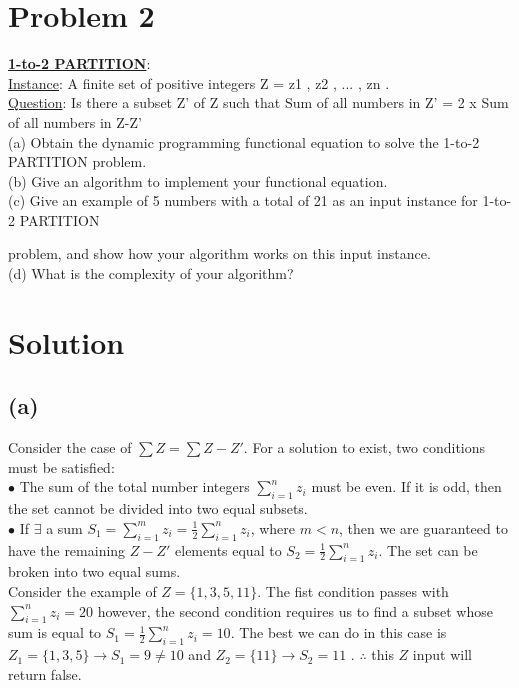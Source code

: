 
\section*{Problem 2}
    \textbf{\underline{1-to-2 PARTITION}}:\\
    \underline{Instance}: A finite set of positive integers Z = { z1 , z2 , ... , zn }.\\
    \underline{Question}: Is there a subset Z' of Z such that
    Sum of all numbers in Z' = 2 x Sum of all numbers in Z-Z'\\
    
    \noindent
    (a) Obtain the dynamic programming functional equation to solve the 1-to-2 PARTITION problem.\\
    (b) Give an algorithm to implement your functional equation.\\
    (c) Give an example of 5 numbers with a total of 21 as an input instance for 1-to-2 PARTITION
    
     problem, and show how your algorithm works on this input instance.\\
    (d) What is the complexity of your algorithm?
\section*{Solution}
	\subsection*{(a)}
		Consider the case of $\sum Z = \sum Z-Z'$. For a solution to exist, two conditions must be satisfied:\\
		$\bullet$ The sum of the total number integers $\sum_{i=1}^{n} z_i$ must be even. If it is odd, then the set cannot be divided into two equal subsets. \\
		$\bullet$ If $\exists$ a sum $S_1 = \sum_{i=1}^{m} z_i = \frac{1}{2}\sum_{i=1}^{n} z_i $, where $m < n$, then we are guaranteed to have the remaining $Z-Z'$ elements equal to $S_2 = \frac{1}{2}\sum_{i=1}^{n} z_i$. The set can be broken into two equal sums.\\
		
		\noindent
		Consider the example of $Z = \{1,3,5,11\}$. The fist condition passes with $\sum_{i=1}^{n} z_i = 20$  however, the second condition requires us to find a subset whose sum is equal to $S_1 = \frac{1}{2}\sum_{i=1}^{n} z_i = 10$. The best we can do in this case is $Z_1 = \{1,3,5\}\rightarrow S_1 = 9\neq 10$ and $Z_2 = \{11\}\rightarrow S_2 = 11$ . $\therefore$ this $Z$ input will return false.\\

